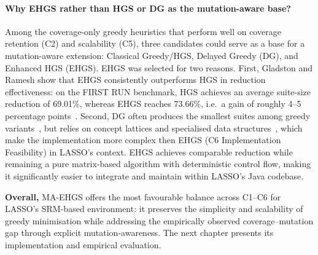 \paragraph{Why EHGS rather than HGS or DG as the mutation-aware base?}

Among the coverage-only greedy heuristics that perform well on coverage retention (C2) and scalability (C5), three candidates could serve as a base for a mutation-aware extension: Classical Greedy/HGS, Delayed Greedy (DG), and Enhanced HGS (EHGS). EHGS was selected for two reasons. First, Gladston and Ramesh show that EHGS consistently outperforms HGS in reduction effectiveness: on the FIRST RUN benchmark, HGS achieves an average suite-size reduction of 69.01\%, whereas EHGS reaches 73.66\%, i.e.\ a gain of roughly 4--5 percentage points~\cite{gladston2015}. Second, DG often produces the smallest suites among greedy variants~\cite{tallam2005,jehan2023}, but relies on concept lattices and specialised data structures~\cite{tallam2005}, which make the implementation more complex then EHGS (C6 Implementation Feasibility) in LASSO's context. EHGS achieves comparable reduction while remaining a pure matrix-based algorithm with deterministic control flow, making it significantly easier to integrate and maintain within LASSO’s Java codebase.

\textbf{Overall,} MA-EHGS offers the most favourable balance across C1--C6 for LASSO’s SRM-based environment: it preserves the simplicity and scalability of greedy minimisation while addressing the empirically observed coverage--mutation gap through explicit mutation-awareness. The next chapter presents its implementation and empirical evaluation.
